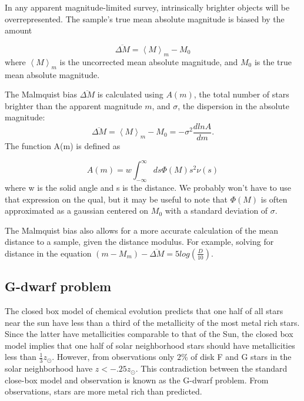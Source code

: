 In any apparent magnitude-limited survey, intrinsically brighter objects will be overrepresented. The sample's true mean absolute magnitude is biased by the amount

\begin{equation}
\overline{\Delta M} = \left<M\right>_m - M_0
\end{equation}
where $\left<M\right>_m $ is the uncorrected mean absolute magnitude, and $M_0$ is the true mean absolute magnitude. 

The Malmquist bias $\overline{\Delta M}$ is calculated using $A(m)$, the total number of stars brighter than the apparent magnitude $m$, and $\sigma$, the dispersion in the absolute magnitude:
\begin{equation}
\overline{\Delta M} = \left<M\right>_m - M_0 = -\sigma^2 \frac{d ln A}{dm}.
\end{equation}
The function A(m) is defined as

\begin{equation}
A(m) = w\int^\infty_{-\infty} ds \Phi(M) s^2 \nu(s)
\end{equation}
where w is the solid angle and s is the distance. We probably won't have to use that expression on the qual, but it may be useful to note that $\Phi(M)$ is often approximated as a gaussian centered on $M_0$ with a standard deviation of $\sigma$. 

The Malmquist bias also allows for a more accurate calculation of the mean distance to a sample, given the distance modulus. For example, solving for distance in the equation $(m-M_m)-\overline{\Delta M} = 5log\left(\frac{D}{10} \right)$.

\subsection{G-dwarf problem}

The closed box model of chemical evolution predicts that one half of all stars near the sun have less than a third of the metallicity of the most metal rich stars.  Since the latter have metallicities comparable to that of the Sun, the closed box model implies that one half of solar neighborhood stars should have metallicities less than $\frac{1}{3}z_\odot$.  However, from observations only $2$\% of disk F and G stars in the solar neighborhood have $z < -.25 z_\odot$.  This contradiction between the standard close-box model and observation is known as the G-dwarf problem.  From observations, stars are more metal rich than predicted.

